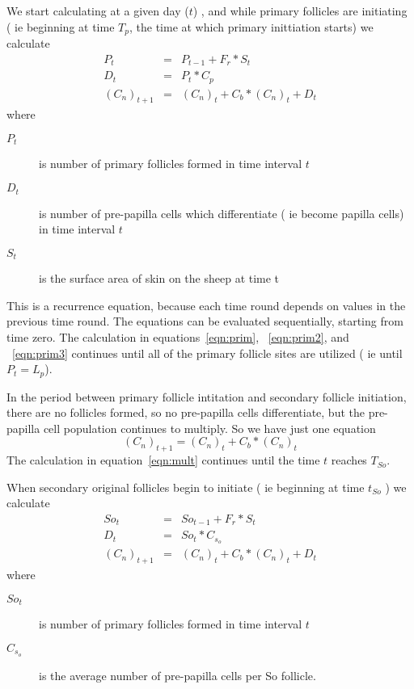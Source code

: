 \documentclass[titlepage]{article}  %
\begin{document}
We start calculating at a given day ($t$) , and while primary follicles are initiating ( ie beginning at time $T_{p}$, the time at which primary inittiation starts) we calculate
\begin{eqnarray}
\label{eqn:prim}
P_{t} & = & P_{t-1} +  F_{r} * S_{t} \\
\label{eqn:prim2}
D_{t} & = & P_{t} * C_{p} \\
\label{eqn:prim3}
(C_{n})_{t+1} & = & (C_{n})_{t} + C_{b} * (C_{n})_{t} + D_{t}
\end{eqnarray}
where 
\begin{description}
\item[$P_{t}$] is number of primary follicles formed in time interval $t$
\item[$D_{t}$] is number of pre-papilla cells which differentiate ( ie become papilla cells) in time interval $t$
\item[$S_{t}$] is the surface area of skin on the sheep at time t
\end{description}
This is a recurrence equation, because each time round depends on values in the previous time round. The equations can be evaluated sequentially, starting from time zero. The calculation in equations~\ref{eqn:prim}, ~\ref{eqn:prim2}, and ~\ref{eqn:prim3} continues until all of the primary follicle sites are utilized ( ie until $ P_{t} = L_{p} $). 

In the period between primary follicle intitation and secondary follicle initiation, there are no follicles formed, so no pre-papilla cells differentiate, but the pre-papilla cell population continues to multiply. So we have just one equation
\begin{equation}
\label{eqn:mult}
(C_{n})_{t+1}  =  (C_{n})_{t} + C_{b} * (C_{n})_{t}
\end{equation}
The calculation in equation~\ref{eqn:mult} continues until the time $t$ reaches  $T_{So}$.

When secondary original follicles begin to initiate ( ie beginning at time $t_{So}$ ) we calculate
\begin{eqnarray}
\label{eqn:so}
So_{t} & = & So_{t-1} +  F_{r} * S_{t} \\
\label{eqn:so2}
D_{t} & = & So_{t} * C_{s_{o}} \\
\label{eqn:so3}
(C_{n})_{t+1} & = & (C_{n})_{t} + C_{b} * (C_{n})_{t} + D_{t}
\end{eqnarray}
where
\begin{description}
\item[$So_{t}$] is number of primary follicles formed in time interval $t$
\item[$C_{s_{o}}$] is the average number of pre-papilla cells per So follicle.
\end{description}
\end{document}
